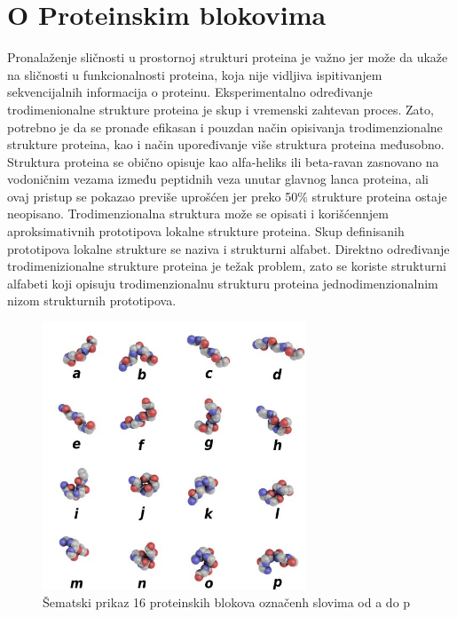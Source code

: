 \documentclass[a4paper,12pt]{article}
\begin{document}
\section{O Proteinskim blokovima}
Pronalaženje sličnosti u prostornoj strukturi proteina je važno jer može da ukaže na sličnosti u funkcionalnosti proteina, koja nije vidljiva ispitivanjem sekvencijalnih informacija o proteinu. Eksperimentalno određivanje trodimenionalne strukture proteina je skup i vremenski zahtevan proces. Zato, potrebno je da se pronađe efikasan i pouzdan način opisivanja trodimenzionalne strukture proteina, kao i način upoređivanje više struktura proteina međusobno.
\\
Struktura proteina se obično opisuje kao alfa-heliks ili beta-ravan zasnovano na vodoničnim vezama između peptidnih veza unutar glavnog lanca proteina, ali ovaj pristup se pokazao previše uprošćen jer preko 50\% strukture proteina ostaje neopisano.\cite{debrevern2010proteinblocks}
Trodimenzionalna struktura može se opisati i korišćennjem aproksimativnih prototipova lokalne strukture proteina. Skup definisanih prototipova lokalne strukture se naziva i strukturni alfabet. Direktno određivanje trodimenizionalne strukture proteina je težak problem, zato se koriste strukturni alfabeti koji opisuju trodimenzionalnu strukturu proteina jednodimenzionalnim nizom strukturnih prototipova. 

\begin{figure}[h!]
    \centering
    \includegraphics[width=0.7\textwidth]{./images/PBs.jpg}
    \caption{Šematski prikaz 16 proteinskih blokova označenh slovima od a do p}
    \label{Slika:pbs}
\end{figure}
\end{document}
